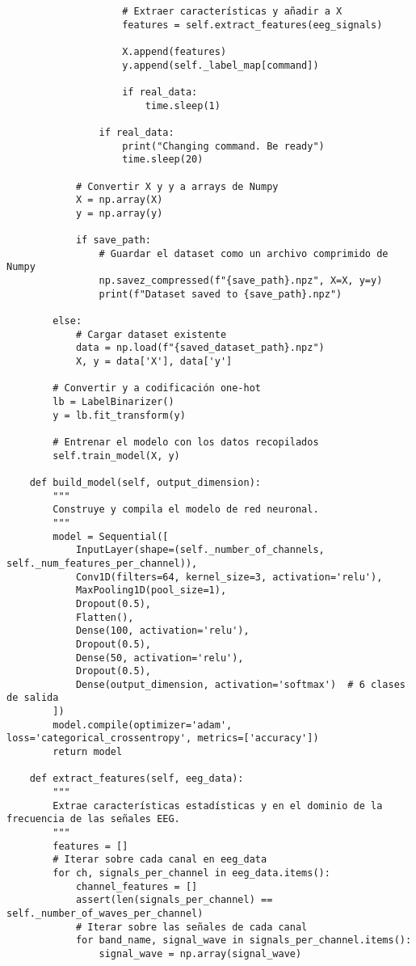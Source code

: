 \documentclass{article}
\begin{document}
\begin{lstlisting}
                    # Extraer características y añadir a X
                    features = self.extract_features(eeg_signals)
                    
                    X.append(features)
                    y.append(self._label_map[command])

                    if real_data:
                        time.sleep(1)
                
                if real_data:
                    print("Changing command. Be ready")
                    time.sleep(20)

            # Convertir X y y a arrays de Numpy
            X = np.array(X)
            y = np.array(y)

            if save_path:
                # Guardar el dataset como un archivo comprimido de Numpy
                np.savez_compressed(f"{save_path}.npz", X=X, y=y)
                print(f"Dataset saved to {save_path}.npz")
        
        else:
            # Cargar dataset existente
            data = np.load(f"{saved_dataset_path}.npz")
            X, y = data['X'], data['y']

        # Convertir y a codificación one-hot
        lb = LabelBinarizer()
        y = lb.fit_transform(y)

        # Entrenar el modelo con los datos recopilados
        self.train_model(X, y)

    def build_model(self, output_dimension):
        """
        Construye y compila el modelo de red neuronal.
        """
        model = Sequential([
            InputLayer(shape=(self._number_of_channels, self._num_features_per_channel)),
            Conv1D(filters=64, kernel_size=3, activation='relu'),
            MaxPooling1D(pool_size=1),
            Dropout(0.5),
            Flatten(),
            Dense(100, activation='relu'),
            Dropout(0.5),
            Dense(50, activation='relu'),
            Dropout(0.5),
            Dense(output_dimension, activation='softmax')  # 6 clases de salida
        ])
        model.compile(optimizer='adam', loss='categorical_crossentropy', metrics=['accuracy'])
        return model

    def extract_features(self, eeg_data):
        """
        Extrae características estadísticas y en el dominio de la frecuencia de las señales EEG.
        """
        features = []
        # Iterar sobre cada canal en eeg_data
        for ch, signals_per_channel in eeg_data.items():
            channel_features = []
            assert(len(signals_per_channel) == self._number_of_waves_per_channel)
            # Iterar sobre las señales de cada canal
            for band_name, signal_wave in signals_per_channel.items():
                signal_wave = np.array(signal_wave)


\end{lstlisting}
\end{document}
